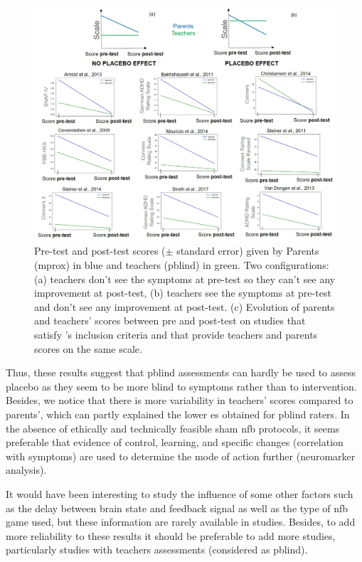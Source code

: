 \begin{figure}[h!]
  \centering
  \includegraphics[width=1.0\linewidth]{figures/discussion_on_placebo_effect_colors_2-columns_fitting_image}
  \caption{Pre-test and post-test scores ($\pm$ standard error) given by Parents (\gls{mprox}) in blue and teachers (\gls{pblind}) in green. Two configurations: (a) teachers don’t see the symptoms at 
	pre-test so they can’t see any improvement at post-test, (b) teachers see the symptoms at pre-test and don’t see any improvement at post-test. (c) Evolution of parents and teachers' scores
	between pre and post-test on studies that satisfy \citeauthor{Cortese2016}'s inclusion criteria and that provide teachers and parents scores on the same scale.}
  \label{Figure:discussion_on_placebo_effect_colors_2-columns_fitting_image}
\end{figure} 

Thus, these results suggest that \gls{pblind} assessments can hardly be used to assess placebo as they seem to be more blind
to symptoms rather than to intervention. Besides, we notice that there is more variability in teachers' scores compared to parents', which can partly
explained the lower \gls{es} obtained for \gls{pblind} raters. In the absence of ethically and technically feasible sham \gls{nfb} protocols, it seems preferable 
that evidence of control, learning, and specific changes (correlation with symptoms) are used to determine the mode of action further 
(neuromarker analysis).      

It would have been interesting to study the influence of some other factors such as the delay between brain state and feedback 
signal as well as the type of \gls{nfb} game used, but these information are rarely available in studies. Besides, 
to add more reliability to these results it should be preferable to add more studies, 
particularly studies with teachers assessments (considered as \gls{pblind}). 

